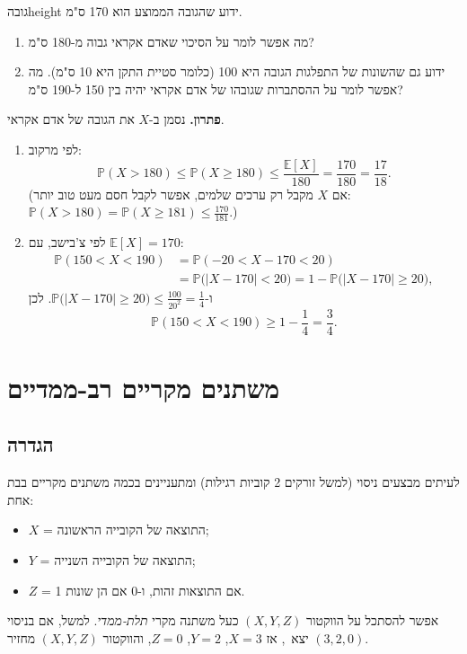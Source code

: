 \documentclass[11pt,a4paper]{report}
\newcommand{\flag}{\tikz[baseline=-0.1ex,x=0.9ex,y=0.9ex]{\draw[line width=0.5pt] (0,-0.3)--(0,1.6); \fill (0,1.6)--(1.2,1.2)--(0,0.8)--cycle;}}
\newcounter{todo}
\newcommand{\addtodo}[1]{\refstepcounter{todo}%
  \addcontentsline{tdo}{todo}{\protect\numberline{\thetodo}#1}}
\newcommand{\needcheck}[1]{\addtodo{#1}%
  {\color{todoc}\sffamily\small\,[\textbf{\flag{}\,\thetodo\ לבדיקה:} #1]\,}}
\renewcommand{\needcheck}[1]{}
\newcommand{\PP}{\mathbb{P}}
\newcommand{\E}{\mathbb{E}}
\begin{document}
\begin{example}{גובה}{height}
ידוע שהגובה הממוצע הוא 170 ס"מ.
\begin{enumerate}[label=(\alph*)]
  \item מה אפשר לומר על הסיכוי שאדם אקראי גבוה מ-180 ס"מ?
  \item ידוע גם שהשונות של התפלגות הגובה היא 100 (כלומר סטיית התקן היא 10 ס"מ). מה אפשר לומר על ההסתברות שגובהו של אדם אקראי יהיה בין 150 ל-190 ס"מ?
\end{enumerate}
\needcheck{ברשימות סעיף (ב) נכתב בטווח "1.50-1.90" (מטרים), בעוד הממוצע 170 (ס"מ). איחדתי לס"מ}

\textbf{פתרון.} נסמן ב-$X$ את הגובה של אדם אקראי.
\begin{enumerate}[label=(\alph*)]
  \item לפי מרקוב:
  \[
    \PP(X>180)\le\PP(X\ge180)\le\frac{\E[X]}{180}=\frac{170}{180}=\frac{17}{18}.
  \]
  (אם $X$ מקבל רק ערכים שלמים, אפשר לקבל חסם מעט טוב יותר: $\PP(X>180)=\PP(X\ge181)\le\frac{170}{181}$.)
  \needcheck{בהערת השוליים ברשימות נכתב $\PP(X\ge181)\le\frac{170}{180}$; תיקנתי ל-$\frac{170}{181}$}
  \item לפי צ'בישב, עם $\E[X]=170$:
  \[
  \begin{aligned}
    \PP(150<X<190)&=\PP(-20<X-170<20)\\&=\PP\big(|X-170|<20\big)=1-\PP\big(|X-170|\ge20\big),
  \end{aligned}
  \]
  ו-$\PP\big(|X-170|\ge20\big)\le\frac{100}{20^2}=\frac14$. לכן
  \[
    \PP(150<X<190)\ge1-\frac14=\frac34.
  \]
\end{enumerate}
\needcheck{ברשימות נכתב בתיבה $\PP(|X-170|\ge20)\ge\frac34$; לפי החישוב, המסקנה הנכונה היא $\PP(|X-170|<20)\ge\frac34$}
\end{example}

\chapter{משתנים מקריים רב-ממדיים}

\section{הגדרה}

לעיתים מבצעים ניסוי (למשל זורקים 2 קוביות רגילות) ומתעניינים בכמה משתנים מקריים בבת אחת:
\begin{itemize}
  \item $X$ = התוצאה של הקובייה הראשונה;
  \item $Y$ = התוצאה של הקובייה השנייה;
  \item $Z$ = 1 אם התוצאות זהות, ו-0 אם הן שונות.
\end{itemize}
אפשר להסתכל על הווקטור $(X,Y,Z)$ כעל משתנה מקרי \emph{תלת-ממדי}. למשל, אם בניסוי יצא \,, אז $X=3$, $Y=2$, $Z=0$, והווקטור $(X,Y,Z)$ מחזיר $(3,2,0)$.
\end{document}
